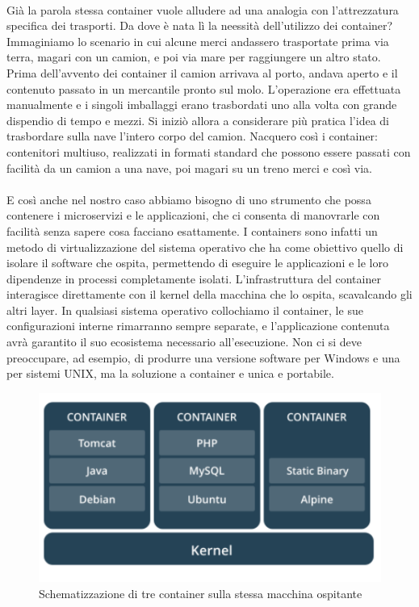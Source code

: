 \paragraph{}
Già la parola stessa container vuole alludere ad una analogia con l'attrezzatura specifica dei trasporti. Da dove è nata lì la neessità dell'utilizzo dei container? Immaginiamo lo scenario in cui alcune merci andassero trasportate prima via terra, magari con un camion, e poi via mare per raggiungere un altro stato. Prima dell'avvento dei container il camion arrivava al porto, andava aperto e il contenuto passato in un mercantile pronto sul molo. L’operazione era effettuata manualmente e i singoli imballaggi erano trasbordati uno alla volta con grande dispendio di tempo e mezzi. Si iniziò allora a considerare più pratica l’idea di trasbordare sulla nave l’intero corpo del camion. Nacquero così i container: contenitori multiuso, realizzati in formati standard che possono essere passati con facilità da un camion a una nave, poi magari su un treno merci e così via.

\paragraph{}
E così anche nel nostro caso abbiamo bisogno di uno strumento che possa contenere i microservizi e le applicazioni, che ci consenta di manovrarle con facilità senza sapere cosa facciano esattamente.
I containers sono infatti un metodo di virtualizzazione del sistema operativo che ha come obiettivo quello di isolare il software che ospita, permettendo di eseguire le applicazioni e le loro dipendenze in processi completamente isolati. L'infrastruttura del container interagisce direttamente con il kernel della macchina che lo ospita, scavalcando gli altri layer. In qualsiasi sistema operativo collochiamo il container, le sue configurazioni interne rimarranno sempre separate, e l'applicazione contenuta avrà garantito il suo ecosistema necessario all'esecuzione. Non ci si deve preoccupare, ad esempio, di produrre una versione software per Windows e una per sistemi UNIX, ma la soluzione a container e unica e portabile. 

\begin{figure}[h!]
	\centering
	\includegraphics[width=\textwidth,keepaspectratio=true]{capitoli/imgs/container.PNG}
	\caption{Schematizzazione di tre container sulla stessa macchina ospitante}
\end{figure}


